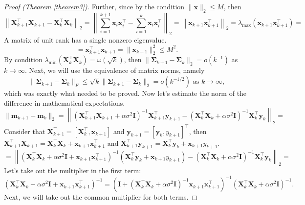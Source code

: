 \documentclass[
11pt,%
tightenlines,%
twoside,%
onecolumn,%
nofloats,%
nobibnotes,%
nofootinbib,%
superscriptaddress,%
noshowpacs,%
centertags]%
{revtex4-2}
\begin{document}
\begin{proof}[Proof (Theorem \ref{theorem3})]
Further, since by the condition $\|\mathbf{x}\|_2 \leqslant M$, then
    \[ \left\| \mathbf{X}^{\top}_{k+1} \mathbf{X}_{k+1} - \mathbf{X}^{\top}_k \mathbf{X}_k \right\|_2 = \left\| \sum\limits_{i=1}^{k+1} \mathbf{x}_i \mathbf{x}_i^{\top} - \sum\limits_{i=1}^{k} \mathbf{x}_i \mathbf{x}_i^{\top} \right\|_2 = \left\| \mathbf{x}_{k+1} \mathbf{x}_{k+1}^{\top} \right\|_2 = \lambda_{\max}\left( \mathbf{x}_{k+1} \mathbf{x}_{k+1}^{\top} \right) = \]
    A matrix of unit rank has a single nonzero eigenvalue.
    \[= \mathbf{x}_{k+1}^{\top} \mathbf{x}_{k+1} = \| \mathbf{x}_{k+1}\|_2^2 \leqslant M^2. \]
By condition $\lambda_{\min}\left(\mathbf{X}^{\top}_k\mathbf{X}_k \right) = \omega(\sqrt{k})$, then $\|\mathbf{\Sigma}_{k+1} - \mathbf{\Sigma}_k\|_2 = o(k^{-1})$ as $k\to \infty$. Next, we will use the equivalence of matrix norms, namely
    \[ \|\mathbf{\Sigma}_{k+1} - \mathbf{\Sigma}_k \|_F \leqslant\sqrt{k}\|\mathbf{\Sigma}_{k+1} - \mathbf{\Sigma}_k\|_2 = o(k^{-1/2}) \text{ as } k\to \infty, \]
    which was exactly what needed to be proved. Now let's estimate the norm of the difference in mathematical expectations.
    \[ \| \mathbf{m}_{k+1} - \mathbf{m}_k \|_2 = \left\| \left( \mathbf{X}_{k+1}^{\top} \mathbf{X}_{k+1} + \alpha \sigma^2 \mathbf{I} \right)^{-1} \mathbf{X}_{k+1}^{\top} \mathbf{y}_{k+1} - \left( \mathbf{X}_k^{\top} \mathbf{X}_k + \alpha \sigma^2 \mathbf{I} \right)^{-1} \mathbf{X}_k^{\top} \mathbf{y}_k \right\|_2 = \]
    Consider that $\mathbf{X}_{k+1}^{\top} = [\mathbf{X}_k^{\top},\mathbf{x}_{k+1}]$ and $\mathbf{y}_{k+1} = [\mathbf{y}_k, y_{k+1}]^{\top}$, then $\mathbf{X}_{k+1}^{\top}\mathbf{X}_{k+1} = \mathbf{X}_k^{\top} \mathbf{X}_k +\mathbf{x}_{k+1} \mathbf{x}_{k+1}^{\top}$ and $\mathbf{X}_{k+1}^{\top}\mathbf{y}_{k+1} = \mathbf{X}_k^{\top} \mathbf{y}_k + \mathbf{x}_{k+1} y_{k+1}$.
    \[ = \left\| \left( \mathbf{X}_k^{\top} \mathbf{X}_k + \alpha \sigma^2 \mathbf{I} + \mathbf{x}_{k+1} \mathbf{x}_{k+1}^{\top} \right)^{-1} \left( \mathbf{X}_k^{\top} \mathbf{y}_k + \mathbf{x}_{k+1} y_{k+1} \right) - \left( \mathbf{X}_k^{\top} \mathbf{X}_k + \alpha \sigma^2 \mathbf{I} \right)^{-1} \mathbf{X}_k^{\top} \mathbf{y}_k \right\|_2 = \]
    Let's take out the multiplier in the first term:
\[\left(\mathbf{X}_k^{\top} \mathbf{X}_k+ \alpha\sigma^2 \mathbf{I} +\mathbf{x}_{k+1}\mathbf{x}_{k+1}^{\top}\right)^{-1}= \left(\mathbf{I} + \left( \mathbf{X}_k^{\top}\mathbf{X}_k +\alpha \sigma^2 \mathbf{I}\right)^{-1}\mathbf{x}_{k+1}\mathbf{x}_{k+1}^{\top}\right)^{-1} \left(\mathbf{X}_k^{\top} \mathbf{X}_k + \alpha \sigma^2 \mathbf{I}\right)^{-1}.\]
Next, we will take out the common multiplier for both terms.

\end{proof}
\end{document}
